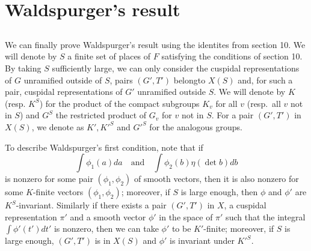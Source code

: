 \section{Waldspurger's result}


\subsection{}
We can finally prove Waldspurger's result using the identites from section 10.
We will denote by $S$ a finite set of places of $F$ satisfying the conditions of section 10.
By taking $S$ sufficiently large, we can only consider the cuspidal representations of $G$ unramified outside of $S$, pairs $(G', T')$ belongto $X(S)$ and, for such a pair, cuspidal representations of $G'$ unramified outside $S$.
We will denote by $K$ (resp. $K^S$) for the product of the compact subgroups $K_v$ for all $v$ (resp.\ all $v$ not in $S$) and $G^S$ the restricted product of $G_v$ for $v$ not in $S$.
For a pair $(G', T')$ in $X(S)$, we denote as $K', K'^S$ and $G'^S$ for the analogous groups.

To describe Waldspurger's first condition, note that if
\begin{equation*}
    \int \phi_1(a)da \quad \text{and} \quad \int \phi_2(b)\eta(\det b)db
\end{equation*}
is nonzero for some pair $(\phi_1, \phi_2)$ of smooth vectors, then it is also nonzero for some $K$-finite vectors $(\phi_1, \phi_2)$; moreover, if $S$ is large enough, then $\phi$ and $\phi'$ are $K^S$-invariant.
Similarly if there exists a pair $(G', T')$ in $X$, a cuspidal representation $\pi'$ and a smooth vector $\phi'$ in the space of $\pi'$ such that the integral $\int \phi'(t')dt'$ is nonzero, then we can take $\phi'$ to be $K'$-finite; moreover, if $S$ is large enough, $(G', T')$ is in $X(S)$ and $\phi'$ is invariant under $K'^S$.


